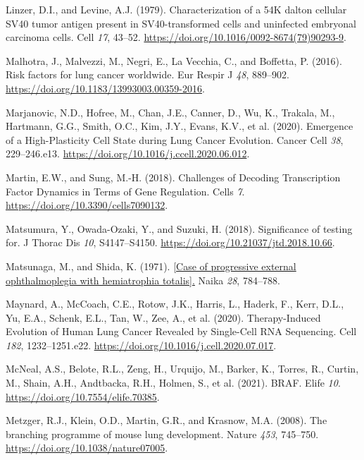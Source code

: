 \begin{CSLReferences}{0}{0}
\leavevmode{}%
Linzer, D.I., and Levine, A.J. (1979). Characterization of a 54K dalton cellular SV40 tumor antigen present in SV40-transformed cells and uninfected embryonal carcinoma cells. Cell \emph{17}, 43--52. \url{https://doi.org/10.1016/0092-8674(79)90293-9}.

\leavevmode{}%
Malhotra, J., Malvezzi, M., Negri, E., La Vecchia, C., and Boffetta, P. (2016). Risk factors for lung cancer worldwide. Eur Respir J \emph{48}, 889--902. \url{https://doi.org/10.1183/13993003.00359-2016}.

\leavevmode{}%
Marjanovic, N.D., Hofree, M., Chan, J.E., Canner, D., Wu, K., Trakala, M., Hartmann, G.G., Smith, O.C., Kim, J.Y., Evans, K.V., et al. (2020). Emergence of a High-Plasticity Cell State during Lung Cancer Evolution. Cancer Cell \emph{38}, 229--246.e13. \url{https://doi.org/10.1016/j.ccell.2020.06.012}.

\leavevmode{}%
Martin, E.W., and Sung, M.-H. (2018). Challenges of Decoding Transcription Factor Dynamics in Terms of Gene Regulation. Cells \emph{7}. \url{https://doi.org/10.3390/cells7090132}.

\leavevmode{}%
Matsumura, Y., Owada-Ozaki, Y., and Suzuki, H. (2018). Significance of testing for. J Thorac Dis \emph{10}, S4147--S4150. \url{https://doi.org/10.21037/jtd.2018.10.66}.

\leavevmode{}%
Matsunaga, M., and Shida, K. (1971). \href{https://www.ncbi.nlm.nih.gov/pubmed/5130083}{{[}Case of progressive external ophthalmoplegia with hemiatrophia totalis{]}.} Naika \emph{28}, 784--788.

\leavevmode{}%
Maynard, A., McCoach, C.E., Rotow, J.K., Harris, L., Haderk, F., Kerr, D.L., Yu, E.A., Schenk, E.L., Tan, W., Zee, A., et al. (2020). Therapy-Induced Evolution of Human Lung Cancer Revealed by Single-Cell RNA Sequencing. Cell \emph{182}, 1232--1251.e22. \url{https://doi.org/10.1016/j.cell.2020.07.017}.

\leavevmode{}%
McNeal, A.S., Belote, R.L., Zeng, H., Urquijo, M., Barker, K., Torres, R., Curtin, M., Shain, A.H., Andtbacka, R.H., Holmen, S., et al. (2021). BRAF. Elife \emph{10}. \url{https://doi.org/10.7554/elife.70385}.

\leavevmode{}%
Metzger, R.J., Klein, O.D., Martin, G.R., and Krasnow, M.A. (2008). The branching programme of mouse lung development. Nature \emph{453}, 745--750. \url{https://doi.org/10.1038/nature07005}.


\end{CSLReferences}
